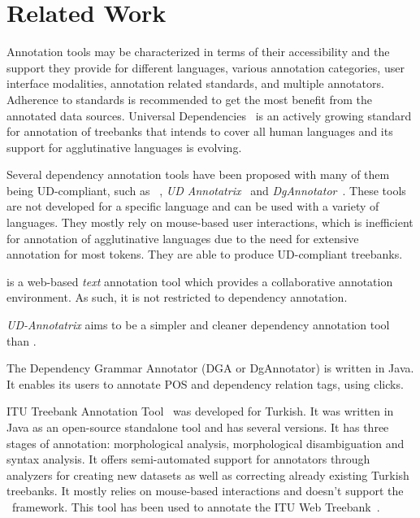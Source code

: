\section{Related Work}
\label{sec:related}

Annotation tools may be characterized in terms of their accessibility and the support they provide for different languages, various annotation categories, user interface modalities, annotation related standards, and multiple annotators.
Adherence to standards is recommended to get the most benefit from the annotated data sources.
Universal Dependencies~\cite{UD} is an actively growing standard for annotation of treebanks that intends to cover all human languages and its support for agglutinative languages is evolving.

Several dependency annotation tools have been proposed with many of them being UD-compliant, such as \brat~\cite{brat}, \textit{UD Annotatrix}~\cite{ud-annotatrix} and \textit{DgAnnotator}~\cite{dgannotator}.
These tools are not developed for a specific language and can be used with a variety of languages.
They mostly rely on mouse-based user interactions, which is inefficient for annotation of agglutinative languages due to the need for extensive annotation for most tokens.
They are able to produce UD-compliant treebanks.

\brat is a web-based \textit{text} annotation tool which provides a collaborative annotation environment. As such, it is not restricted to dependency annotation.

\textit{UD-Annotatrix} aims to be a simpler and cleaner dependency annotation tool than \brat.

The Dependency Grammar Annotator (DGA or DgAnnotator) is written in Java. It enables its users to annotate POS and dependency relation tags, using clicks.

ITU Treebank Annotation Tool~\cite{itu-annotation-tool} was developed for Turkish.
It was written in Java as an open-source standalone tool and has several versions.
It has three stages of annotation: morphological analysis, morphological disambiguation and syntax analysis.
It offers semi-automated support for annotators through analyzers for creating new datasets as well as correcting already existing Turkish treebanks.
It mostly relies on mouse-based interactions and doesn't support the \ud\ framework.
This tool has been used to annotate the ITU Web Treebank~\cite{itu-web-tb}.

